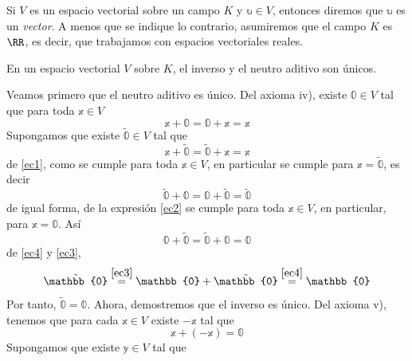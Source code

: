 Si $V$ es un espacio vectorial sobre un campo $K$ y $\mathbb{u} \in V$, entonces diremos que $\mathbb{u}$ es un \emph{vector}. A menos que se indique lo contrario, asumiremos que el campo $K$ es $\RR$, es decir, que trabajamos con espacios vectoriales reales.

\begin{theorem}{}{}
     En un espacio vectorial $V$ sobre $K$, el inverso y el neutro aditivo son únicos.

    \tcblower
    \demostracion Veamos primero que el neutro aditivo es único. Del axioma iv), existe $\mathbb{0} \in V$ tal que para toda $\mathbb{x} \in V$
    \begin{equation}
        \mathbb{x} + \mathbb{0} = \mathbb{0} + \mathbb{x} = \mathbb{x} \label{ec1}
    \end{equation}
    Supongamos que existe $\tilde{\mathbb{0}} \in V$ tal que
    \begin{equation}
        \mathbb{x} + \tilde{\mathbb{0}} = \tilde{\mathbb{0}} + \mathbb{x} = \mathbb{x} \label{ec2}
    \end{equation}
    de \eqref{ec1}, como se cumple para toda $\mathbb{x} \in V$, en particular se cumple para $\mathbb{x} = \tilde{\mathbb{0}}$, es decir
    \begin{equation}
        \tilde{\mathbb{0}} + \mathbb{0} = \mathbb{0} + \tilde{\mathbb{0}} = \tilde{\mathbb{0}} \label{ec3}
    \end{equation}
    de igual forma, de la expresión \eqref{ec2} se cumple para toda $\mathbb{x} \in V$, en particular, para $\mathbb{x} = \mathbb{0}$. Así
    \begin{equation}
        \mathbb{0} + \tilde{\mathbb{0}} = \tilde{\mathbb{0}} + \mathbb{0} = \mathbb{0} \label{ec4}
    \end{equation}
    de \eqref{ec4} y \eqref{ec3},
    \begin{equation*}
        \tilde{\mathbb{0}} \stackrel{\eqref{ec3}}{=} \mathbb{0} + \tilde{\mathbb{0}} \stackrel{\eqref{ec4}}{=} \mathbb{0}
    \end{equation*}
    Por tanto, $\tilde{\mathbb{0}} = \mathbb{0}$. Ahora, demostremos que el inverso es único. Del axioma v), tenemos que para cada $\mathbb{x} \in V$ existe $-\mathbb{x}$ tal que
    \begin{equation}
        \mathbb{x} + (-\mathbb{x}) = \mathbb{0} \label{ec5}
    \end{equation}
    Supongamos que existe $\mathbb{y} \in V$ tal que
    \begin{equation}

\end{equation}
\end{theorem}
